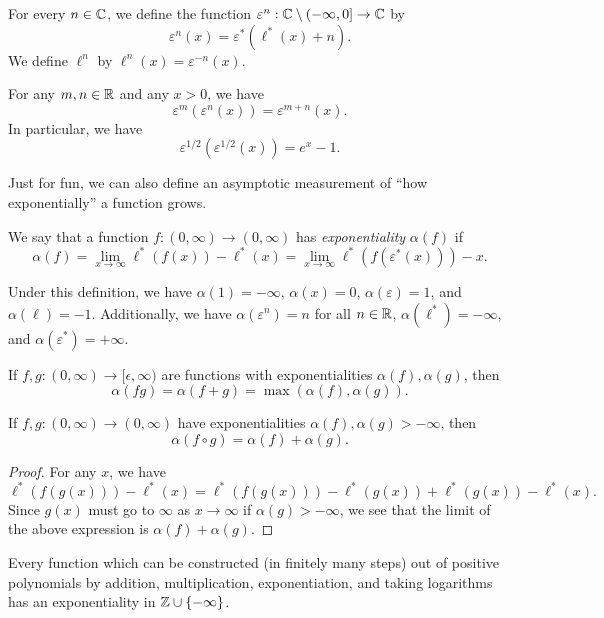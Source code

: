 \documentclass[letterpaper,11pt]{article}
\begin{document}
\begin{defn} For every $n \in \mathbb{C}$, we define the function $\varepsilon^n : \mathbb{C} \setminus (-\infty,0] \rightarrow \mathbb{C}$ by
\[
\varepsilon^n(x) = \varepsilon^*(\ell^*(x) + n).
\]
We define $\ell^n$ by $\ell^n(x) = \varepsilon^{-n}(x)$.
\end{defn}

\begin{prop} For any $m,n \in \mathbb{R}$ and any $x > 0$, we have
\[
\varepsilon^m(\varepsilon^n(x)) = \varepsilon^{m+n}(x).
\]
In particular, we have
\[
\varepsilon^{1/2}(\varepsilon^{1/2}(x)) = e^x - 1.
\]
\end{prop}

Just for fun, we can also define an asymptotic measurement of ``how exponentially'' a function grows.

\begin{defn} We say that a function $f:(0,\infty) \rightarrow (0,\infty)$ has \emph{exponentiality} $\alpha(f)$ if
\[
\alpha(f) = \lim_{x\rightarrow \infty} \ell^*(f(x)) - \ell^*(x) = \lim_{x \rightarrow \infty} \ell^*(f(\varepsilon^*(x))) - x.
\]
\end{defn}

Under this definition, we have $\alpha(1) = -\infty$, $\alpha(x) = 0$, $\alpha(\varepsilon) = 1$, and $\alpha(\ell) = -1$. Additionally, we have $\alpha(\varepsilon^n) = n$ for all $n \in \mathbb{R}$, $\alpha(\ell^*) = -\infty$, and $\alpha(\varepsilon^*) = +\infty$.

\begin{prop} If $f,g : (0,\infty) \rightarrow [\epsilon,\infty)$ are functions with exponentialities $\alpha(f), \alpha(g)$, then
\[
\alpha(fg) = \alpha(f+g) = \max(\alpha(f),\alpha(g)).
\]
\end{prop}

\begin{prop} If $f,g : (0,\infty) \rightarrow (0,\infty)$ have exponentialities $\alpha(f), \alpha(g) > -\infty$, then
\[
\alpha(f \circ g) = \alpha(f) + \alpha(g).
\]
\end{prop}
\begin{proof} For any $x$, we have
\[
\ell^*(f(g(x))) - \ell^*(x) = \ell^*(f(g(x))) - \ell^*(g(x)) + \ell^*(g(x)) - \ell^*(x).
\]
Since $g(x)$ must go to $\infty$ as $x \rightarrow \infty$ if $\alpha(g) > -\infty$, we see that the limit of the above expression is $\alpha(f) + \alpha(g)$.
\end{proof}

\begin{cor} Every function which can be constructed (in finitely many steps) out of positive polynomials by addition, multiplication, exponentiation, and taking logarithms has an exponentiality in $\mathbb{Z} \cup \{-\infty\}$.
\end{cor}



\end{document}
